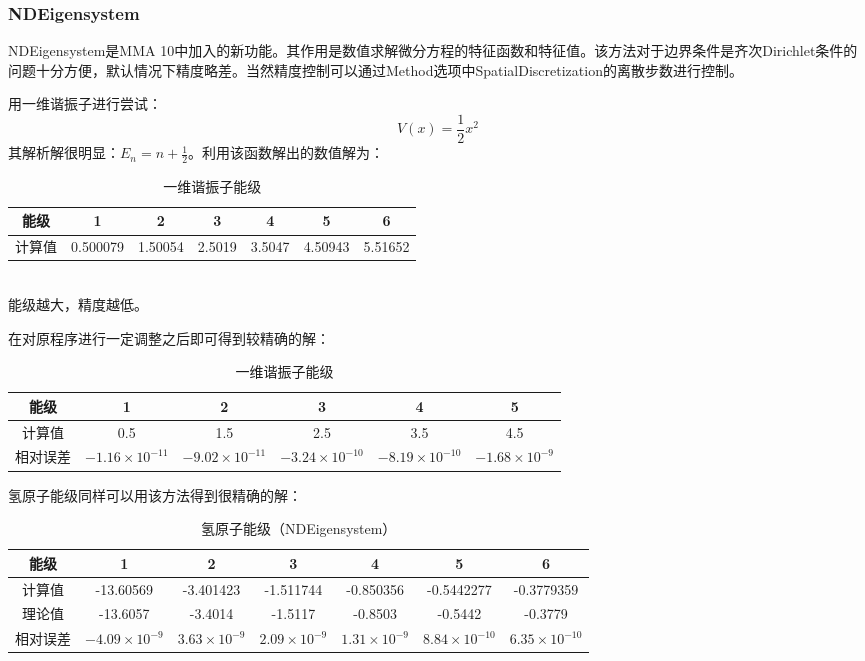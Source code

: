 \documentclass[hyperref,cs4size,titlepage,twoside]{ctexart}
\begin{document}
\subsubsection{NDEigensystem}
NDEigensystem是MMA 10中加入的新功能。其作用是数值求解微分方程的特征函数和特征值。该方法对于边界条件是齐次Dirichlet条件的问题十分方便，默认情况下精度略差。当然精度控制可以通过Method选项中SpatialDiscretization的离散步数进行控制。

用一维谐振子进行尝试：
\begin{equation}\label{HarmonicOscillator}
  V(x)=\frac{1}{2}x^2
\end{equation}
其解析解很明显：$\displaystyle E_n=n+\frac{1}{2}$。利用该函数解出的数值解为：
\begin{table}[!htdp]
  \centering
  \begin{tabular}{|c|c|c|c|c|c|c|}
    \hline
    能级 & 1 & 2 & 3 & 4 & 5 & 6 \\
    \hline
    计算值 & 0.500079 & 1.50054 & 2.5019 & 3.5047 & 4.50943 & 5.51652\\
    \hline
  \end{tabular}
  \caption{一维谐振子能级}
\end{table}\\
能级越大，精度越低。

在对原程序进行一定调整之后即可得到较精确的解：
\begin{table}[!htdp]
  \centering
  \begin{tabular}{|c|c|c|c|c|c|}
    \hline
    能级 & 1 & 2 & 3 & 4 & 5 \\
    \hline
    计算值 & 0.5 & 1.5 & 2.5 & 3.5 & 4.5 \\
    \hline
    相对误差 &$-1.16\times10^{-11}$&$ -9.02\times10^{-11}$&$-3.24\times10^{-10}$&$ -8.19\times10^{-10}$&$-1.68\times10^{-9}$\\
    \hline
  \end{tabular}
  \caption{一维谐振子能级}
\end{table}

氢原子能级同样可以用该方法得到很精确的解：
\clearpage
\begin{table}[!htdp]
  \centering
  \begin{tabular}{|c|c|c|c|c|c|c|}
    \hline
    能级 & 1 & 2 & 3 & 4 & 5 & 6 \\
    \hline
    计算值 & -13.60569 & -3.401423 & -1.511744 & -0.850356 & -0.5442277 & -0.3779359\\
    \hline
    理论值 & -13.6057 & -3.4014 & -1.5117 & -0.8503 & -0.5442 & -0.3779 \\
    \hline
    相对误差 & $-4.09\times10^{-9}$& $3.63\times10^{-9}$& $2.09\times10^{-9}$& $ 1.31\times10^{-9}$& $8.84\times10^{-10}$& $6.35\times10^{-10}$ \\
    \hline
  \end{tabular}
  \caption{氢原子能级（NDEigensystem）}
\end{table}
\end{document}
